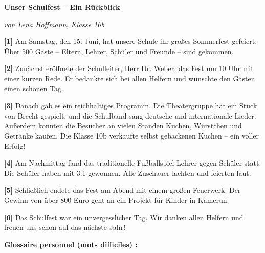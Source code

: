 \documentclass[11pt]{article}
\begin{document}
\begin{textebox}
\textbf{Unser Schulfest – Ein Rückblick}\par
\emph{von Lena Hoffmann, Klasse 10b}\par
\medskip
\textbf{[1]} Am Samstag, den 15. Juni, hat unsere Schule ihr großes Sommerfest gefeiert. Über 500 Gäste – Eltern, Lehrer, Schüler und Freunde – sind gekommen.\par
\textbf{[2]} Zunächst eröffnete der Schulleiter, Herr Dr. Weber, das Fest um 10 Uhr mit einer kurzen Rede. Er bedankte sich bei allen Helfern und wünschte den Gästen einen schönen Tag.\par
\textbf{[3]} Danach gab es ein reichhaltiges Programm. Die Theatergruppe hat ein Stück von Brecht gespielt, und die Schulband sang deutsche und internationale Lieder. Außerdem konnten die Besucher an vielen Ständen Kuchen, Würstchen und Getränke kaufen. Die Klasse 10b verkaufte selbst gebackenen Kuchen – ein voller Erfolg!\par
\textbf{[4]} Am Nachmittag fand das traditionelle Fußballspiel Lehrer gegen Schüler statt. Die Schüler haben mit 3:1 gewonnen. Alle Zuschauer lachten und feierten laut.\par
\textbf{[5]} Schließlich endete das Fest am Abend mit einem großen Feuerwerk. Der Gewinn von über 800 Euro geht an ein Projekt für Kinder in Kamerun.\par
\textbf{[6]} Das Schulfest war ein unvergesslicher Tag. Wir danken allen Helfern und freuen uns schon auf das nächste Jahr!
\end{textebox}

\textbf{Glossaire personnel (mots difficiles) :}
\end{document}
